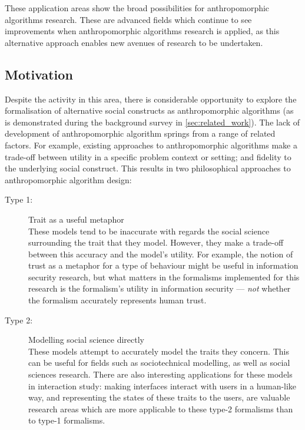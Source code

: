 These application areas show the broad possibilities for anthropomorphic algorithms research. These are advanced fields which continue to see improvements when anthropomorphic algorithms research is applied, as this alternative approach enables new avenues of research to be undertaken.\par

\subsection{Motivation}

Despite the activity in this area, there is considerable opportunity to explore the formalisation of alternative social constructs as anthropomorphic algorithms (as is demonstrated during the background survey in \cref{sec:related_work}). The lack of development of anthropomorphic algorithm springs from a range of related factors. For example, existing approaches to anthropomorphic algorithms make a trade-off between utility in a specific problem context or setting; and fidelity to the underlying social construct. This results in two philosophical approaches to anthropomorphic algorithm design:

\begin{description}
    \item [Type 1: ] Trait as a useful metaphor\\
    These models tend to be inaccurate with regards the social science surrounding the trait that they model. However, they make a trade-off between this accuracy and the model's utility. For example, the notion of trust as a metaphor for a type of behaviour might be useful in information security research, but what matters in the formalisms implemented for this research is the formalism's utility in information security --- \emph{not} whether the formalism accurately represents human trust.
\item [Type 2: ] Modelling social science directly\\
    These models attempt to accurately model the traits they concern. This can be useful for fields such as sociotechnical modelling, as well as social sciences research. There are also interesting applications for these models in interaction study: making interfaces interact with users in a human-like way, and representing the states of these traits to the users, are valuable research areas which are more applicable to these type-2 formalisms than to type-1 formalisms.
\end{description}

